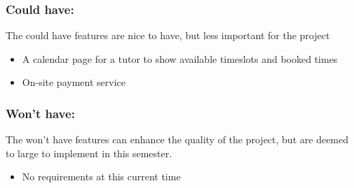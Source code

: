 \subsubsection{Could have:}
The could have features are nice to have, but less important for the project

\begin{itemize}
    \item A calendar page for a tutor to show available timeslots and booked times 
    \item On-site payment service
\end{itemize}

\subsubsection{Won't have:}
The won't have features can enhance the quality of the project, but are deemed to large to implement in this semester.
\begin{itemize}
    \item No requirements at this current time
\end{itemize}